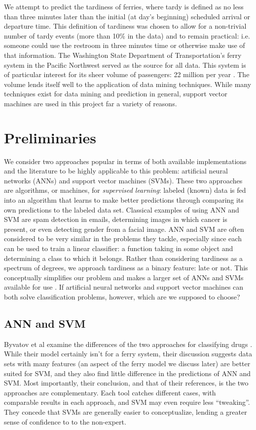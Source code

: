 \documentclass[11pt]{article} %
\begin{document}
We attempt to predict the tardiness of ferries, where tardy is 
defined as no less than three minutes later than the
initial (at day's beginning) scheduled arrival or departure time. This definition
of tardiness was chosen to allow for a non-trivial number of tardy events 
(more than 10\% in the data) and to remain practical: i.e. someone could use the
restroom in three minutes time or otherwise make use of that information. The 
Washington State Department of Transportation's ferry system in the Pacific
Northwest served as the source for all data. This system is of 
particular interest for its sheer volume of passengers: 22 million per year 
\cite{wsfTraffic}.  The volume lends itself well to the application of 
data mining techniques. While many techniques exist for data mining and 
prediction in general, support vector machines are used in this project far a 
variety of reasons.


\section{Preliminaries}
\label{sec:prelims}
We consider two approaches popular in terms of both available implementations and 
the literature to be highly applicable to this problem:
artificial neural networks (ANNs) and support vector machines (SVMs). These two 
approaches are algorithms, or machines, for
\textit{supervised learning}: labeled (known) data is fed into an
algorithm that learns to make better predictions through comparing its own 
predictions to the labeled data set. Classical examples of using ANN and SVM are
spam detection in emails, determining images in which cancer is present, or even
detecting gender from a facial image. ANN and SVM are often considered to be
very similar in the problems they tackle, especially since each can
be used to train a linear classifier: a function taking in some object and 
determining a class to which it belongs. Rather than considering tardiness as a 
spectrum of degrees, we approach tardiness as a binary feature: late or not. This 
conceptually simplifies our problem and makes a larger set of ANNs and SVMs 
available for use .  If artificial neural networks and support vector machines 
can both solve classification problems, however, which are we supposed to choose?

\subsection{ANN and SVM}
\label{sec:ann_svm}
Byvatov et al examine the differences of the two approaches for classifying drugs
\cite{byvatov2003comparison}. While their model certainly isn't for a ferry 
system, their discussion suggests data sets with many features (an aspect of the 
ferry model we discuss later) are better suited for SVM, and they also find little
difference in the predictions of ANN and SVM. Most importantly, their conclusion,
and that of their references, is the two approaches are complementary. Each 
tool catches different cases, with comparable results in each approach,
and SVM may even require less ``tweaking''. They concede that SVMs are generally
easier to conceptualize, lending a greater sense of confidence to to the 
non-expert.
\end{document}
